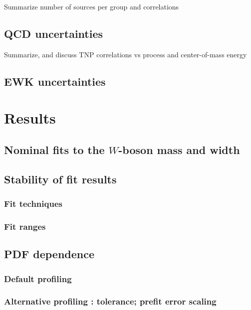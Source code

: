 \documentclass[NOTE, REPORT=true, atlasdraft=true, british, subfigure]{atlasdoc}
\begin{document}
Summarize number of sources per group and correlations

\section{QCD uncertainties}

Summarize, and discuss TNP correlations vs process and center-of-mass energy

\section{EWK uncertainties}

\chapter{Results}
\label{sec:results}

\section{Nominal fits to the $W$-boson mass and width}

\section{Stability of fit results}
\subsection{Fit techniques}
\subsection{Fit ranges}

\section{PDF dependence}
\subsection{Default profiling}
\subsection{Alternative profiling : tolerance; prefit error scaling}

\end{document}
